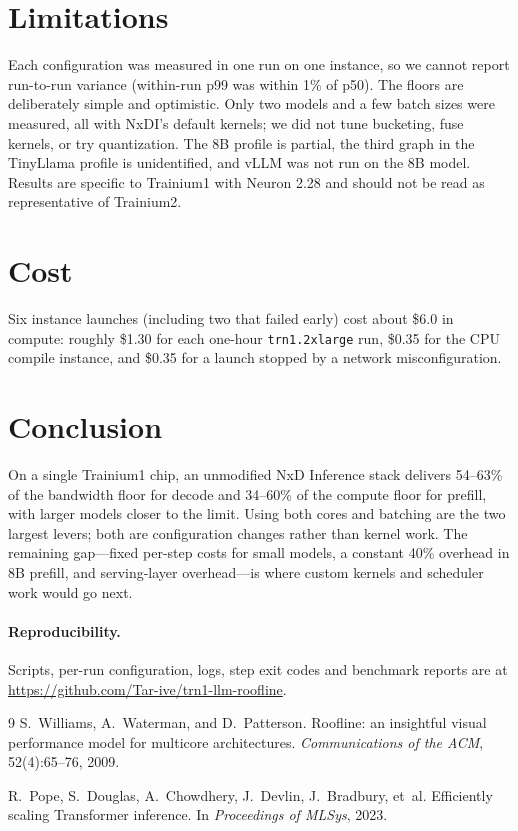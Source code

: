 \documentclass[11pt]{article}
\newcommand{\repo}{\url{https://github.com/Tar-ive/trn1-llm-roofline}}
\begin{document}
\section{Limitations}
Each configuration was measured in one run on one instance, so we cannot report run-to-run variance (within-run p99 was within
1\% of p50). The floors are deliberately simple and optimistic. Only two models and a few batch sizes were measured, all with
NxDI's default kernels; we did not tune bucketing, fuse kernels, or try quantization. The 8B profile is partial, the third graph in
the TinyLlama profile is unidentified, and vLLM was not run on the 8B model. Results are specific to Trainium1 with Neuron 2.28 and
should not be read as representative of Trainium2.

\section{Cost}
Six instance launches (including two that failed early) cost about \$6.0 in compute: roughly \$1.30 for each one-hour
\texttt{trn1.2xlarge} run, \$0.35 for the CPU compile instance, and \$0.35 for a launch stopped by a network misconfiguration.

\section{Conclusion}
On a single Trainium1 chip, an unmodified NxD Inference stack delivers 54--63\% of the bandwidth floor for decode and 34--60\% of
the compute floor for prefill, with larger models closer to the limit. Using both cores and batching are the two largest
levers; both are configuration changes rather than kernel work. The remaining gap---fixed per-step costs for small models,
a constant 40\% overhead in 8B prefill, and serving-layer overhead---is where custom kernels and scheduler work would go next.

\paragraph{Reproducibility.} Scripts, per-run configuration, logs, step exit codes and benchmark reports are at \repo.

\begin{thebibliography}{9}
S.~Williams, A.~Waterman, and D.~Patterson.
\newblock Roofline: an insightful visual performance model for multicore architectures.
\newblock \emph{Communications of the ACM}, 52(4):65--76, 2009.

R.~Pope, S.~Douglas, A.~Chowdhery, J.~Devlin, J.~Bradbury, et~al.
\newblock Efficiently scaling Transformer inference.
\newblock In \emph{Proceedings of MLSys}, 2023.
\end{thebibliography}
\end{document}

